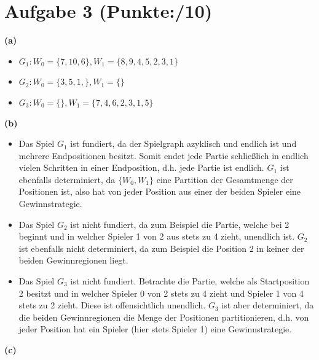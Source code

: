 \documentclass[11pt, a4paper]{article}
\newcommand{\pp}{10}
\begin{document}
\section*{Aufgabe 3 (Punkte:\qquad/\pp)}
\textbf{(a)}
\begin{adjustwidth}{20pt}{20pt}
	\begin{itemize}
	\item $G_1: W_0 = \{ 7,10,6\}, W_1 = \{ 8,9,4,5,2,3,1\}$
	\item $G_2: W_0 = \{ 3,5,1,\}, W_1 = \{\}$
	\item $G_3: W_0 = \{\}, W_1 = \{ 7,4,6,2,3,1,5\}$
	\end{itemize}
\end{adjustwidth}
\textbf{(b)}
\begin{adjustwidth}{20pt}{20pt}
	\begin{itemize}
	\item Das Spiel $G_1$ ist fundiert, da der Spielgraph azyklisch und endlich ist und mehrere Endpositionen besitzt. Somit endet jede Partie schließlich in endlich vielen Schritten 
	in einer Endposition, d.h. jede Partie ist endlich. $G_1$ ist ebenfalls determiniert, da $\{ W_0,W_1\}$ eine Partition der Gesamtmenge der Positionen ist, also hat von jeder Position
	aus einer der beiden Spieler eine Gewinnstrategie.
	\item Das Spiel $G_2$ ist nicht fundiert, da zum Beispiel die Partie, welche bei 2 beginnt und in welcher Spieler 1 von 2 aus stets zu 4 zieht, unendlich ist. $G_2$ ist ebenfalls
	nicht determiniert, da zum Beispiel die Position 2 in keiner der beiden Gewinnregionen liegt.
	\item Das Spiel $G_3$ ist nicht fundiert. Betrachte die Partie, welche als Startposition 2 besitzt und in welcher Spieler 0 von 2 stets zu 4 zieht und Spieler 1 von 4 stets zu 2 zieht.
	Diese ist offensichtlich unendlich. $G_3$ ist aber determiniert, da die beiden Gewinnregionen die Menge der Positionen partitionieren, d.h. von jeder Position hat ein Spieler (hier stets
	Spieler 1) eine Gewinnstrategie.
	\end{itemize}
\end{adjustwidth}
\textbf{(c)}
\end{document}
